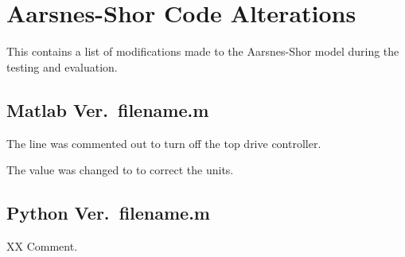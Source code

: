 \chapter{Aarsnes-Shor Code Alterations}
This \appendixname{} contains a list of modifications made to the Aarsnes-Shor model during the testing and evaluation.

\section{Matlab Ver.\ {\codefont filename.m}}
\begin{codemodifications}

\begin{codemodification}{19}
The line was commented out to turn off the top drive controller.
\end{codemodification}

\begin{codemodification}{25}%
The value  was changed to  to correct the units.
\end{codemodification}

\begin{codemodification}{29}
\lipsum[1]
\end{codemodification}

\end{codemodifications}

\section{Python Ver.\ {\codefont filename.m}}
\begin{codemodifications}

\begin{codemodification}{XX}
Comment.
\end{codemodification}

\end{codemodifications}